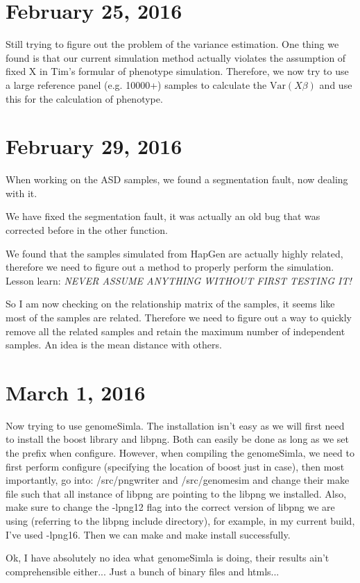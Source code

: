 \documentclass[12pt]{article}
\begin{document}
	\section{February 25, 2016}
	Still trying to figure out the problem of the variance estimation. 
	One thing we found is that our current simulation method actually violates the assumption of fixed X in Tim's formular of phenotype simulation.
	Therefore, we now try to use a large reference panel (e.g. 10000+) samples to calculate the $\mathrm{Var}(X\beta)$ and use this for the calculation of phenotype.
	\section{February 29, 2016}
	When working on the ASD samples, we found a segmentation fault, now dealing with it.
	
	We have fixed the segmentation fault, it was actually an old bug that was corrected before in the other function.
	
	We found that the samples simulated from HapGen are actually highly related, therefore we need to figure out a method to properly perform the simulation.
	Lesson learn: \emph{NEVER ASSUME ANYTHING WITHOUT FIRST TESTING IT!}
	
	So I am now checking on the relationship matrix of the samples, it seems like most of the samples are related. 
	Therefore we need to figure out a way to quickly remove all the related samples and retain the maximum number of independent samples.
	An idea is the mean distance with others.
	
	\section{March 1, 2016}
	Now trying to use genomeSimla. 
	The installation isn't easy as we will first need to install the boost library and libpng.
	Both can easily be done as long as we set the prefix when configure.
	However, when compiling the genomeSimla, we need to first perform configure (specifying the location of boost just in case), then most importantly, go into:
	/src/pngwriter and /src/genomesim and change their make file such that all instance of libpng are pointing to the libpng we installed. 
	Also, make sure to change the -lpng12 flag into the correct version of libpng we are using (referring to the libpng include directory), for example, in my current build, I've used -lpng16. 
	Then we can make and make install successfully.
	
	Ok, I have absolutely no idea what genomeSimla is doing, their results ain't comprehensible either... 
	Just a bunch of binary files and htmls...
	
\end{document}
